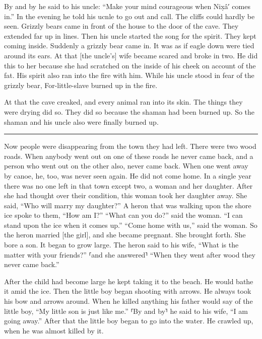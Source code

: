 By and by he said to his uncle:
\qqk{}“Make your mind courageous when Nix̣â′ comes in.”
In the evening he told his ucnle to go out and call.
The cliffs could hardly be seen.
Grizzly bears came in front of the house to the door of the cave.
They extended far up in lines.
Then his uncle started the song for the spirit.
They kept coming inside.
Suddenly a grizzly bear came in.
It was as if eagle down were tied around its ears.
At that [the uncle’s] wife became scared
and broke in two.
He did this to her because she had scratched on the inside of his cheek on account of the fat.
His spirit also ran into the fire with him.
While his uncle stood in fear of the grizzly bear, For-little-slave burned up in the fire.

At that the cave creaked, and every animal ran into its skin.
The things they were drying did so.
They did so because the shaman had been burned up.
So the shaman and his uncle also were finally burned up.

\fancybreak{\rule{16em}{0.125pt}}

Now people were disappearing from the town they had left.
There were two wood roads.
When anybody went out on one of these roads he never came back,
and a person who went out on the other also, never came back.
When one went away by canoe, he, too, was never seen again.
He did not come home.
In a single year there was no one left in that town
except two, a woman and her daughter.
After she had thought over their condition, this woman took her daughter away.
She said, “Who will marry my daughter?”
A heron that was walking upon the shore ice
spoke to them,
“How am I?”
“What can you do?” said the woman.
“I can stand upon the ice when it comes up.”
“Come home with us,”
said the woman.
So the heron married [the girl],
and she became pregnant.
She brought forth.
She bore a son.
It began to grow large.
The heron said to his wife,
\qqk{}“What is the matter with your friends?”
⸢and she answered⸣ “When they went after wood they never came back.”

After the child had become large he kept taking it to the beach.
He would bathe it amid the ice.
Then the little boy began shooting with arrows.
He always took his bow and arrows around.
When he killed anything his father would say of the little boy,
\qqk{}“My little son is just like me.”
⸢By and by⸣ he said to his wife,
\qqk{}“I am going away.”
After that the little boy began to go into the water.
He crawled up, when he was almost killed by it.

